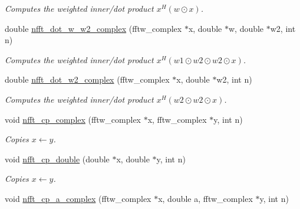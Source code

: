 \begin{CompactItemize}
\begin{CompactList}\small\item\em Computes the weighted inner/dot product $x^H (w \odot x)$. \item\end{CompactList}\item 
\hypertarget{group__nfftutil_g68268fc9bfad5a7e7383098ac1715674}{
double \hyperlink{group__nfftutil_g68268fc9bfad5a7e7383098ac1715674}{nfft\_\-dot\_\-w\_\-w2\_\-complex} (fftw\_\-complex $\ast$x, double $\ast$w, double $\ast$w2, int n)}
\label{group__nfftutil_g68268fc9bfad5a7e7383098ac1715674}

\begin{CompactList}\small\item\em Computes the weighted inner/dot product $x^H (w1\odot w2\odot w2 \odot x)$. \item\end{CompactList}\item 
\hypertarget{group__nfftutil_g9b59288597d159357fe86395e635a075}{
double \hyperlink{group__nfftutil_g9b59288597d159357fe86395e635a075}{nfft\_\-dot\_\-w2\_\-complex} (fftw\_\-complex $\ast$x, double $\ast$w2, int n)}
\label{group__nfftutil_g9b59288597d159357fe86395e635a075}

\begin{CompactList}\small\item\em Computes the weighted inner/dot product $x^H (w2\odot w2 \odot x)$. \item\end{CompactList}\item 
\hypertarget{group__nfftutil_g21fd5b4d5f6113538320188306611133}{
void \hyperlink{group__nfftutil_g21fd5b4d5f6113538320188306611133}{nfft\_\-cp\_\-complex} (fftw\_\-complex $\ast$x, fftw\_\-complex $\ast$y, int n)}
\label{group__nfftutil_g21fd5b4d5f6113538320188306611133}

\begin{CompactList}\small\item\em Copies $x \leftarrow y$. \item\end{CompactList}\item 
\hypertarget{group__nfftutil_gb220a37bd6e58be7413507b17ca3bfe2}{
void \hyperlink{group__nfftutil_gb220a37bd6e58be7413507b17ca3bfe2}{nfft\_\-cp\_\-double} (double $\ast$x, double $\ast$y, int n)}
\label{group__nfftutil_gb220a37bd6e58be7413507b17ca3bfe2}

\begin{CompactList}\small\item\em Copies $x \leftarrow y$. \item\end{CompactList}\item 
\hypertarget{group__nfftutil_g33409df91e7ad5e1dca3beaa63e0ef25}{
void \hyperlink{group__nfftutil_g33409df91e7ad5e1dca3beaa63e0ef25}{nfft\_\-cp\_\-a\_\-complex} (fftw\_\-complex $\ast$x, double a, fftw\_\-complex $\ast$y, int n)}
\label{group__nfftutil_g33409df91e7ad5e1dca3beaa63e0ef25}


\end{CompactItemize}
